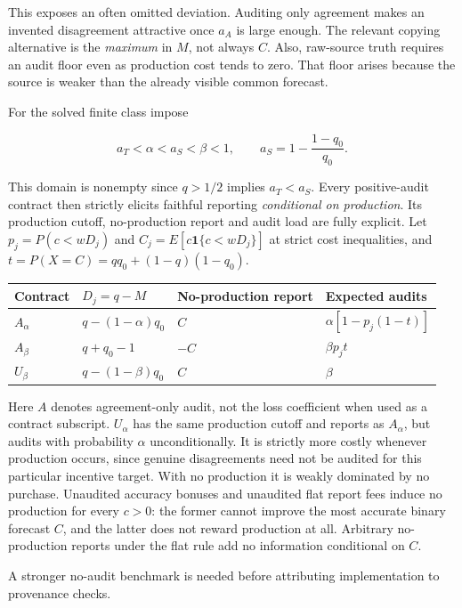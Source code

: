 \documentclass[
  11pt,
]{article}
\begin{document}
This exposes an often omitted deviation. Auditing only agreement makes
an invented disagreement attractive once \(a_A\) is large enough. The
relevant copying alternative is the \emph{maximum} in \(M\), not always
\(C\). Also, raw-source truth requires an audit floor even as production
cost tends to zero. That floor arises because the source is weaker than
the already visible common forecast.

For the solved finite class impose

\[a_T<\alpha<a_S<\beta<1,\qquad
 a_S=1-\frac{1-q_0}{q_0}. \tag{I4}\]

This domain is nonempty since \(q>1/2\) implies \(a_T<a_S\). Every
positive-audit contract then strictly elicits faithful reporting
\emph{conditional on production}. Its production cutoff, no-production
report and audit load are fully explicit. Let \(p_j=P(c<wD_j)\) and
\(C_j=E[c\mathbf1\{c<wD_j\}]\) at strict cost inequalities, and
\(t=P(X=C)=q q_0+(1-q)(1-q_0)\).

\begin{center}
\small
\begin{tabular}{llll}
\toprule
Contract & $D_j=q-M$ & No-production report & Expected audits \\
\midrule
$A_\alpha$ & $q-(1-\alpha)q_0$ & $C$ & $\alpha[1-p_j(1-t)]$ \\
$A_\beta$ & $q+q_0-1$ & $-C$ & $\beta p_jt$ \\
$U_\beta$ & $q-(1-\beta)q_0$ & $C$ & $\beta$ \\
\bottomrule
\end{tabular}
\end{center}

Here \(A\) denotes agreement-only audit, not the loss coefficient when
used as a contract subscript. \(U_\alpha\) has the same production
cutoff and reports as \(A_\alpha\), but audits with probability
\(\alpha\) unconditionally. It is strictly more costly whenever
production occurs, since genuine disagreements need not be audited for
this particular incentive target. With no production it is weakly
dominated by no purchase. Unaudited accuracy bonuses and unaudited flat
report fees induce no production for every \(c>0\): the former cannot
improve the most accurate binary forecast \(C\), and the latter does not
reward production at all. Arbitrary no-production reports under the flat
rule add no information conditional on \(C\).

A stronger no-audit benchmark is needed before attributing
implementation to provenance checks.
\end{document}
